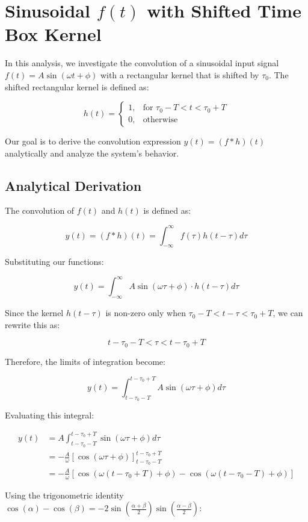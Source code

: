 \section{Sinusoidal $f(t)$ with Shifted Time Box Kernel}
In this analysis, we investigate the convolution of a sinusoidal input signal $f(t) = A\sin(\omega t + \phi)$ with a rectangular kernel that is shifted by $\tau_0$. The shifted rectangular kernel is defined as:

$$
h(t)= \begin{cases}
1, & \text{for } \tau_0-T < t < \tau_0+T \\
0, & \text{otherwise}
\end{cases}
$$

Our goal is to derive the convolution expression $y(t)=(f * h)(t)$ analytically and analyze the system's behavior.

\subsection{Analytical Derivation}

The convolution of $f(t)$ and $h(t)$ is defined as:

$$
y(t) = (f * h)(t) = \int_{-\infty}^{\infty} f(\tau)h(t-\tau)d\tau
$$

Substituting our functions:

$$
y(t) = \int_{-\infty}^{\infty} A\sin(\omega \tau + \phi) \cdot h(t-\tau)d\tau
$$

Since the kernel $h(t-\tau)$ is non-zero only when $\tau_0-T < t-\tau < \tau_0+T$, we can rewrite this as:

$$
t-\tau_0-T < \tau < t-\tau_0+T
$$

Therefore, the limits of integration become:

$$
y(t) = \int_{t-\tau_0-T}^{t-\tau_0+T} A\sin(\omega \tau + \phi)d\tau
$$

Evaluating this integral:

\begin{align*}
y(t) &= A\int_{t-\tau_0-T}^{t-\tau_0+T} \sin(\omega \tau + \phi)d\tau \\
&= -\frac{A}{\omega}[\cos(\omega \tau + \phi)]_{t-\tau_0-T}^{t-\tau_0+T} \\
&= -\frac{A}{\omega}[\cos(\omega(t-\tau_0+T) + \phi) - \cos(\omega(t-\tau_0-T) + \phi)]
\end{align*}

Using the trigonometric identity $\cos(\alpha) - \cos(\beta) = -2\sin\left(\frac{\alpha+\beta}{2}\right)\sin\left(\frac{\alpha-\beta}{2}\right)$:

